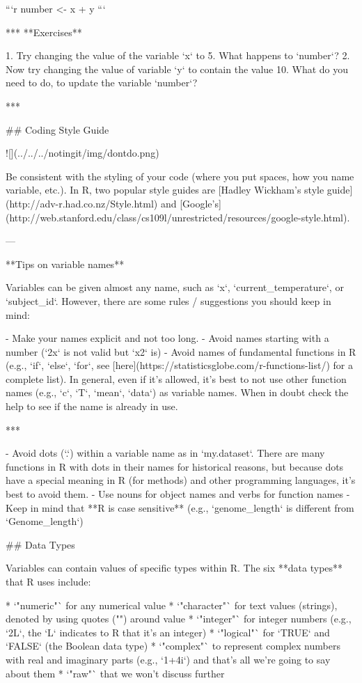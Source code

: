 ```r
number <- x + y
```

***
**Exercises**

1. Try changing the value of the variable `x` to 5. What happens to `number`?
2. Now try changing the value of variable `y` to contain the value 10. What do you need to do, to update the variable `number`?

***

## Coding Style Guide

![](../../../notingit/img/dontdo.png)

Be consistent with the styling of your code (where you put spaces, how you name variable, etc.). In R, two popular style guides are [Hadley Wickham's style guide](http://adv-r.had.co.nz/Style.html) and [Google's](http://web.stanford.edu/class/cs109l/unrestricted/resources/google-style.html).

---

**Tips on variable names**

Variables can be given almost any name, such as `x`, `current_temperature`, or
`subject_id`. However, there are some rules / suggestions you should keep in mind:

- Make your names explicit and not too long.
- Avoid names starting with a number (`2x` is not valid but `x2` is)
- Avoid names of fundamental functions in R (e.g., `if`, `else`, `for`, see [here](https://statisticsglobe.com/r-functions-list/) for a complete list). In general, even if it's allowed, it's best to not use other function names (e.g., `c`, `T`, `mean`, `data`) as variable names. When in doubt
check the help to see if the name is already in use. 


***

- Avoid dots (`.`) within a variable name as in `my.dataset`. There are many functions
in R with dots in their names for historical reasons, but because dots have a
special meaning in R (for methods) and other programming languages, it's best to
avoid them. 
- Use nouns for object names and verbs for function names
- Keep in mind that **R is case sensitive** (e.g., `genome_length` is different from `Genome_length`)


## Data Types

Variables can contain values of specific types within R. The six **data types** that R uses include: 

* `"numeric"` for any numerical value 
* `"character"` for text values (strings), denoted by using quotes ("") around value   
* `"integer"` for integer numbers (e.g., `2L`, the `L` indicates to R that it's an integer)
* `"logical"` for `TRUE` and `FALSE` (the Boolean data type)
* `"complex"` to represent complex numbers with real and imaginary parts (e.g.,
  `1+4i`) and that's all we're going to say about them
* `"raw"` that we won't discuss further

